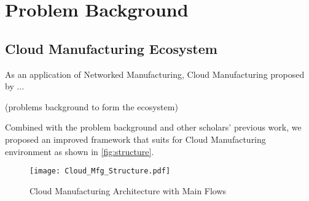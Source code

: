 \section{Problem Background} %
\label{sec:problem_background}

\subsection{Cloud Manufacturing Ecosystem} %
\label{sub:cloud_manufacturing_ecosystem}
As an application of Networked Manufacturing, Cloud Manufacturing proposed by ...

(problems background to form the ecosystem)

Combined with the problem background and other scholars' previous work, we proposed an improved framework that suits for Cloud Manufacturing environment as shown in \autoref{fig:structure}.
\begin{figure}[htbp]
\centering
\texttt{[image: Cloud\_Mfg\_Structure.pdf]}
\caption{Cloud Manufacturing Architecture with Main Flows}
\label{fig:structure}
\end{figure}

